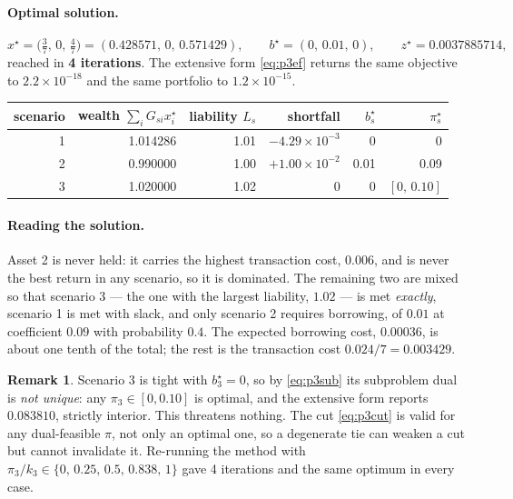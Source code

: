 \documentclass[11pt]{article}
\theoremstyle{definition}
\newtheorem{remark}{Remark}
\begin{document}
\paragraph{Optimal solution.}
\[
  x^\star = \bigl(\tfrac37,\, 0,\, \tfrac47\bigr)
          = (0.428571,\, 0,\, 0.571429), \qquad
  b^\star = (0,\, 0.01,\, 0), \qquad
  z^\star = 0.0037885714 ,
\]
reached in \textbf{4 iterations}. The extensive form \eqref{eq:p3ef}
returns the same objective to $2.2 \times 10^{-18}$ and the same
portfolio to $1.2 \times 10^{-15}$.

\begin{center}
\begin{tabular}{@{}rrrrrr@{}}
\toprule
scenario & wealth $\sum_i G_{si}x^\star_i$ & liability $L_s$
  & shortfall & $b_s^\star$ & $\pi_s^\star$\\
\midrule
1 & 1.014286 & 1.01 & $-4.29\times10^{-3}$ & 0 & 0\\
2 & 0.990000 & 1.00 & $+1.00\times10^{-2}$ & 0.01 & 0.09\\
3 & 1.020000 & 1.02 & $0$ & 0 & $[0,\,0.10]$\\
\bottomrule
\end{tabular}
\end{center}

\paragraph{Reading the solution.} Asset 2 is never held: it carries the
highest transaction cost, $0.006$, and is never the best return in any
scenario, so it is dominated. The remaining two are mixed so that
scenario 3 --- the one with the largest liability, $1.02$ --- is met
\emph{exactly}, scenario 1 is met with slack, and only scenario 2
requires borrowing, of $0.01$ at coefficient $0.09$ with probability
$0.4$. The expected borrowing cost, $0.00036$, is about one tenth of
the total; the rest is the transaction cost $0.024/7 = 0.003429$.

\begin{remark}
Scenario 3 is tight with $b_3^\star = 0$, so by \eqref{eq:p3sub} its
subproblem dual is \emph{not unique}: any $\pi_3 \in [0,0.10]$ is
optimal, and the extensive form reports $0.083810$, strictly interior.
This threatens nothing. The cut \eqref{eq:p3cut} is valid for any
dual-feasible $\pi$, not only an optimal one, so a degenerate tie can
weaken a cut but cannot invalidate it. Re-running the method with
$\pi_3/k_3 \in \{0,\,0.25,\,0.5,\,0.838,\,1\}$ gave 4 iterations and
the same optimum in every case.
\end{remark}
\end{document}
